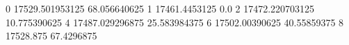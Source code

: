 0 17529.501953125 68.056640625
1 17461.4453125 0.0
2 17472.220703125 10.775390625
4 17487.029296875 25.583984375
6 17502.00390625 40.55859375
8 17528.875 67.4296875

